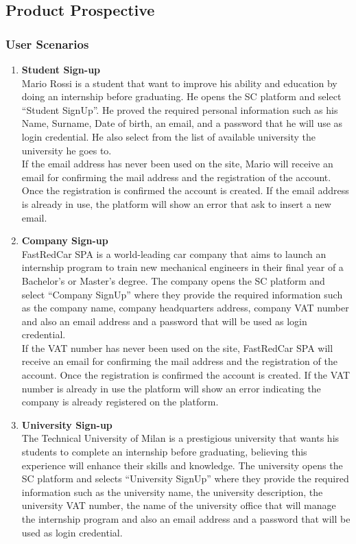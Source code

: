 \subsection{Product Prospective}

\subsubsection{User Scenarios}

\begin{enumerate}
    \item \textbf{Student Sign-up}\\
      Mario Rossi is a student that want to improve his ability and education by doing an internship before graduating. He opens the SC platform and select “Student SignUp”. He proved the required personal information such as his Name, Surname, Date of birth, an email, and a password that he will use as login credential. He also select from the list of available university the university he goes to.\\
      If the email address has never been used on the site, Mario will receive an email for confirming the mail address and the registration of the account. Once the registration is confirmed the account is created. If the email address is already in use, the platform will show an error that ask to insert a new email.
    \item \textbf{Company Sign-up}\\
        FastRedCar SPA is a world-leading car company that aims to launch an internship program to train new mechanical engineers in their final year of a Bachelor’s or Master’s degree. The company opens the SC platform and select “Company SignUp” where they provide the required information such as the company name, company headquarters address, company VAT number and also an email address and a password that will be used as login credential.\\
        If the VAT number has never been used on the site, FastRedCar SPA will receive an email for confirming the mail address and the registration of the account. Once the registration is confirmed the account is created.
        If the VAT number is already in use the platform will show an error indicating the company is already registered on the platform.
    \item \textbf{University Sign-up}\\
        The Technical University of Milan is a prestigious university that wants his students to complete an internship before graduating, believing this experience will enhance their skills and knowledge. The university opens the SC platform and selects “University SignUp” where they provide the required information such as the university name, the university description, the university VAT number, the name of the university office that will manage the internship program and also an email address and a password that will be used as login credential.\\

\end{enumerate}
